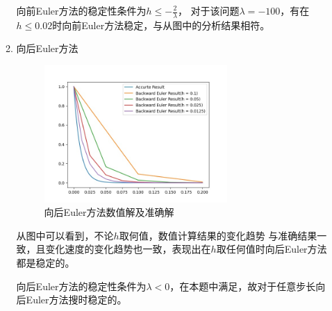 \documentclass{article}
\begin{document}
\begin{enumerate}
\begin{enumerate}
        向前Euler方法的稳定性条件为$h \leq -\frac{2}{\lambda}$，
        对于该问题$\lambda = -100$，有在$h \leq 0.02$时向前Euler方法稳定，与从图中的分析结果相符。
        \item 向后Euler方法
        \begin{figure}[H]
            \centering
            \includegraphics[width=0.7\textwidth]{../fig/backward_euler.jpg}
            \caption{向后Euler方法数值解及准确解}
            \label{backward_euler}
        \end{figure}
        从图中可以看到，不论$h$取何值，数值计算结果的变化趋势
        与准确结果一致，且变化速度的变化趋势也一致，表现出在$h$取任何值时向后Euler方法都是稳定的。

        向后Euler方法的稳定性条件为$\lambda < 0$，在本题中满足，故对于任意步长向后Euler方法搜时稳定的。


\end{enumerate}
\end{enumerate}
\end{document}
